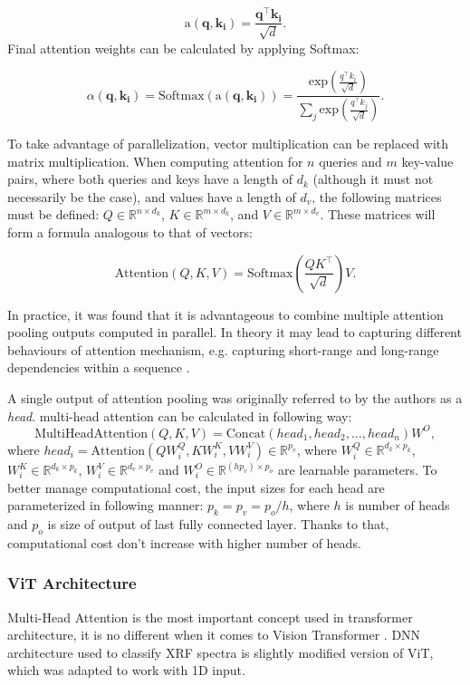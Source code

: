 \[\text{a}(\mathbf{q}, {\mathbf{k_i}}) = \frac{\mathbf{q}^\intercal \mathbf{k_i}}{\sqrt{d}}.\]
Final attention weights can be calculated by applying Softmax: 

\[\alpha(\mathbf{q}, \mathbf{k_i}) = \text{Softmax}(\text{a}(\mathbf{q}, \mathbf{k_i})) =\frac{\text{exp}(\frac{q^\intercal k_i}{\sqrt{d}})}{\sum_j \text{exp}(\frac{q^\intercal k_j}{\sqrt{d}})}.\]

To take advantage of parallelization, vector multiplication can be replaced with matrix multiplication. When computing attention for $n$ queries and $m$ key-value pairs, where both queries and keys have a length of $d_k$ (although it must not necessarily be the case), and values have a length of $d_v$, the following matrices must be defined: $Q \in \mathbb{R}^{n \times d_k}$, $K \in \mathbb{R}^{m \times d_k}$, and $V \in \mathbb{R}^{m \times d_v}$. These matrices will form a formula analogous to that of vectors:

\[\text{Attention}(Q, K, V) = \text{Softmax}(\frac{Q K^\intercal}{\sqrt{d}})V.\]

In practice, it was found that it is advantageous to combine multiple attention pooling outputs computed in parallel. 
In theory it may lead to capturing different behaviours of attention mechanism, e.g. capturing short-range and long-range dependencies within a sequence \cite{d2lMultiHeadAttention}.


A single output of attention pooling was originally referred to by the authors as a \emph{head}. 
multi-head attention can be calculated in following way: 
\[\text{MultiHeadAttention}(Q, K, V)  = \text{Concat}(head_1, head_2, \dots, head_n)W^O,\]
where $head_i = \text{Attention}(QW_i^Q, KW_i^K, VW_i^V) \in \mathbb{R}^{p_v}$, where $W_i^Q \in \mathbb{R}^{d_k \times p_k}$, $W_i^K \in \mathbb{R}^{d_k \times p_k}$, $W_i^V \in \mathbb{R}^{d_v \times p_v}$ and $W_i^O \in \mathbb{R}^{(hp_v) \times p_o}$ are learnable parameters.
To better manage computational cost, the input sizes for each head are parameterized in following manner: $p_k = p_v = p_o / h$, where $h$ is number of heads and $p_o$ is size of output of last fully connected layer. Thanks to that, computational cost don't increase with higher number of heads.

\subsubsection{ViT Architecture}
Multi-Head Attention is the most important concept used in transformer architecture, it is no different when it comes to Vision Transformer \cite{vitPaper}.
DNN architecture used to classify XRF spectra is slightly modified version of ViT, which was adapted to work with 1D input.

